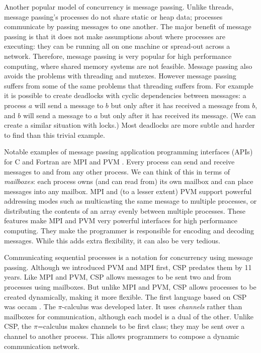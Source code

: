 Another popular model of concurrency is message passing.
Unlike threads, message passing's processes do not share static or heap
data;
processes communicate by passing messages to one another.
The major benefit of message passing is that it does not make assumptions
about where processes are executing:
they can be running all on one machine or spread-out across a network.
Therefore, message passing is very popular for high performance computing,
where shared memory systems are not feasible.
Message passing also avoids the problems with threading and mutexes.
However message passing suffers from some of the same problems that
threading suffers from.
For example it is possible to create deadlocks with cyclic dependencies
between messages:
a process $a$ will send a message to $b$ but only after it has received a
message from $b$,
and $b$ will send a message to $a$ but only after it has received its message.
(We can create a similar situation with locks.)
Most deadlocks are more subtle and harder to find than this trivial example.

Notable examples of message passing application programming interfaces (APIs)
for C and Fortran \citep{backus:1957:fortran} are
MPI \citep{mpi} and PVM \citep{pvm}.
Every process can send and receive messages to and from any other process.
We can think of this in terms of \emph{mailboxes}:
each process owns (and can read from) its own mailbox and can place messages
into any mailbox.
MPI and (to a lesser extent) PVM
support powerful addressing modes
such as multicasting the same message to multiple processes, or
distributing the contents of an array evenly between
multiple processes.
These features make MPI and PVM very powerful interfaces for high performance
computing.
They make the programmer is responsible for encoding and decoding messages.
While this adds extra flexibility,
it can also be very tedious.

Communicating sequential processes \citep{hoare:1978:csp} is a notation for
concurrency using message passing.
Although we introduced PVM and MPI first, CSP predates them by 11 years.
Like MPI and PVM, CSP allows messages to be sent two and from processes
using mailboxes.
But unlike MPI and PVM, CSP allows processes to be created dynamically,
making it more flexible.
The first language based on CSP was occam \citep{occam1, occam3}.
The $\pi$-calculus \citep{milner:pi} was developed later.
It uses \emph{channels} rather than mailboxes for communication,
although each model is a dual of the other.
Unlike CSP, the $\pi$=calculus makes channels to be first class;
they may be sent over a channel to another process.
This allows programmers to compose a dynamic communication network.

